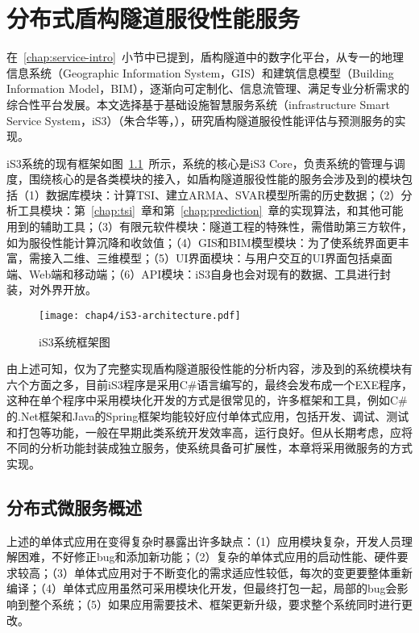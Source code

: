 \chapter{分布式盾构隧道服役性能服务}
\label{chap:service}

在~\ref{chap:service-intro}~小节中已提到，盾构隧道中的数字化平台，从专一的地理信息系统（Geographic Information System，GIS）和建筑信息模型（Building Information Model，BIM），逐渐向可定制化、信息流管理、满足专业分析需求的综合性平台发展。本文选择基于基础设施智慧服务系统（infrastructure Smart Service System，iS3）（朱合华等，\citeyear{朱合华2018智慧基础设施}），研究盾构隧道服役性能评估与预测服务的实现。

iS3系统的现有框架如图~\ref{fig:iS3系统框架图}~所示，系统的核心是iS3 Core，负责系统的管理与调度，围绕核心的是各类模块的接入，如盾构隧道服役性能的服务会涉及到的模块包括（1）数据库模块：计算TSI、建立ARMA、SVAR模型所需的历史数据；（2）分析工具模块：第~\ref{chap:tsi}~章和第~\ref{chap:prediction}~章的实现算法，和其他可能用到的辅助工具；（3）有限元软件模块：隧道工程的特殊性，需借助第三方软件，如为服役性能计算沉降和收敛值；（4）GIS和BIM模型模块：为了使系统界面更丰富，需接入二维、三维模型；（5）UI界面模块：与用户交互的UI界面包括桌面端、Web端和移动端；（6）API模块：iS3自身也会对现有的数据、工具进行封装，对外界开放。

\begin{figure}[htb!]
    \centering
    \texttt{[image: chap4/iS3-architecture.pdf]}
    \caption{iS3系统框架图}
    \label{fig:iS3系统框架图}
\end{figure}

由上述可知，仅为了完整实现盾构隧道服役性能的分析内容，涉及到的系统模块有六个方面之多，目前iS3程序是采用C\#语言编写的，最终会发布成一个EXE程序，这种在单个程序中采用模块化开发的方式是很常见的，许多框架和工具，例如C\#的.Net框架和Java的Spring框架均能较好应付单体式应用，包括开发、调试、测试和打包等功能，一般在早期此类系统开发效率高，运行良好。但从长期考虑，应将不同的分析功能封装成独立服务，使系统具备可扩展性，本章将采用微服务的方式实现。

\section{分布式微服务概述}

上述的单体式应用在变得复杂时暴露出许多缺点：（1）应用模块复杂，开发人员理解困难，不好修正bug和添加新功能；（2）复杂的单体式应用的启动性能、硬件要求较高；（3）单体式应用对于不断变化的需求适应性较低，每次的变更要整体重新编译；（4）单体式应用虽然可采用模块化开发，但最终打包一起，局部的bug会影响到整个系统；（5）如果应用需要技术、框架更新升级，要求整个系统同时进行更改。

